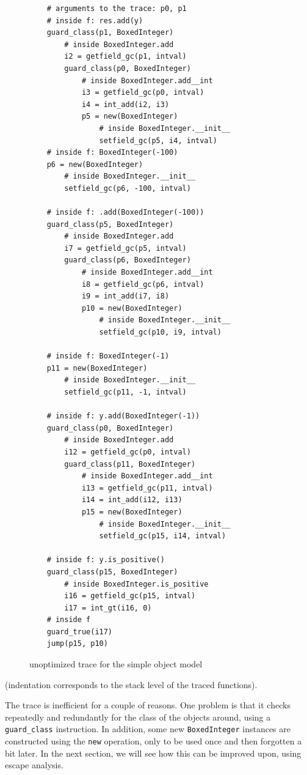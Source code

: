 \documentclass{sigplanconf}
\begin{document}
\begin{figure}
\begin{verbatim}
    # arguments to the trace: p0, p1
    # inside f: res.add(y)
    guard_class(p1, BoxedInteger)
        # inside BoxedInteger.add
        i2 = getfield_gc(p1, intval)
        guard_class(p0, BoxedInteger)
            # inside BoxedInteger.add__int
            i3 = getfield_gc(p0, intval)
            i4 = int_add(i2, i3)
            p5 = new(BoxedInteger)
                # inside BoxedInteger.__init__
                setfield_gc(p5, i4, intval)
    # inside f: BoxedInteger(-100) 
    p6 = new(BoxedInteger)
        # inside BoxedInteger.__init__
        setfield_gc(p6, -100, intval)

    # inside f: .add(BoxedInteger(-100))
    guard_class(p5, BoxedInteger)
        # inside BoxedInteger.add
        i7 = getfield_gc(p5, intval)
        guard_class(p6, BoxedInteger)
            # inside BoxedInteger.add__int
            i8 = getfield_gc(p6, intval)
            i9 = int_add(i7, i8)
            p10 = new(BoxedInteger)
                # inside BoxedInteger.__init__
                setfield_gc(p10, i9, intval)

    # inside f: BoxedInteger(-1)
    p11 = new(BoxedInteger)
        # inside BoxedInteger.__init__
        setfield_gc(p11, -1, intval)

    # inside f: y.add(BoxedInteger(-1))
    guard_class(p0, BoxedInteger)
        # inside BoxedInteger.add
        i12 = getfield_gc(p0, intval)
        guard_class(p11, BoxedInteger)
            # inside BoxedInteger.add__int
            i13 = getfield_gc(p11, intval)
            i14 = int_add(i12, i13)
            p15 = new(BoxedInteger)
                # inside BoxedInteger.__init__
                setfield_gc(p15, i14, intval)

    # inside f: y.is_positive()
    guard_class(p15, BoxedInteger)
        # inside BoxedInteger.is_positive
        i16 = getfield_gc(p15, intval)
        i17 = int_gt(i16, 0)
    # inside f
    guard_true(i17)
    jump(p15, p10)
\end{verbatim}
\caption{unoptimized trace for the simple object model}
\end{figure}

(indentation corresponds to the stack level of the traced functions).

The trace is inefficient for a couple of reasons. One problem is that it checks
repeatedly and redundantly for the class of the objects around, using a
\texttt{guard\_class} instruction. In addition, some new \texttt{BoxedInteger} instances are
constructed using the \texttt{new} operation, only to be used once and then forgotten
a bit later. In the next section, we will see how this can be improved upon,
using escape analysis.
\end{document}
